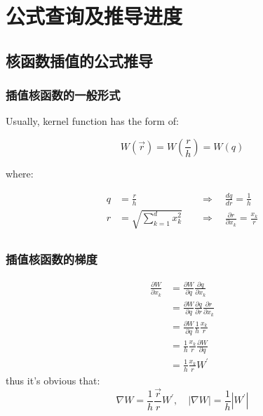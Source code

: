 \section{公式查询及推导进度}

\subsection{核函数插值的公式推导}

\begin{frame}
    \frametitle{插值核函数的一般形式}
Usually, kernel function has the form of:

\begin{equation}
    W(\vec{r})=W\left(
        \frac{r}{h}
    \right)=W(q)
\end{equation}

where:

\begin{equation}
    \begin{aligned}
        q &= \frac{r}{h} \quad &\Rightarrow \quad \frac{dq}{dr}= \frac{1}{h}\\
        r &= \sqrt{\sum_{k=1}^d x_k^2} \quad &\Rightarrow \quad \frac{\partial r}{\partial x_k} = \frac{x_k}{r}\\
    \end{aligned}
\end{equation}
\end{frame}


\begin{frame}
    \frametitle{插值核函数的梯度}
    \begin{equation}
        \begin{aligned}
            \frac{\partial W}{\partial x_k} &= \frac{\partial W}{\partial q}\frac{\partial q}{\partial x_k}\\
            &= \frac{\partial W}{\partial q}\frac{\partial q}{\partial r}\frac{\partial r}{\partial x_k}\\
            &= \frac{\partial W}{\partial q}\frac{1}{h}\frac{x_k}{r}\\
            &= \frac{1}{h}\frac{x_k}{r}\frac{\partial W}{\partial q}\\
            &= \frac{1}{h}\frac{x_k}{r}W^\prime
        \end{aligned}
    \end{equation}
    thus it's obvious that:
    \begin{equation}
        \nabla W = \frac{1}{h}\frac{\vec{r}}{r}W^\prime
        ,\quad |\nabla W| = \frac{1}{h}|W^\prime|
    \end{equation}
\end{frame}


